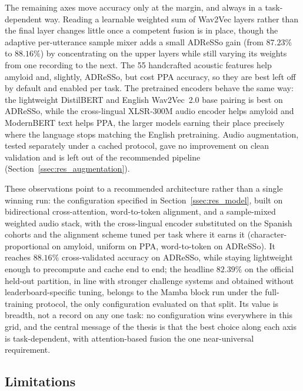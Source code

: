 \documentclass[a4paper,12pt]{article}
\begin{document}
The remaining axes move accuracy only at the margin, and always in a task-dependent way. Reading a learnable weighted sum of Wav2Vec layers rather than the final layer changes little once a competent fusion is in place, though the adaptive per-utterance sample mixer adds a small ADReSSo gain (from $87.23\%$ to $88.16\%$) by concentrating on the upper layers while still varying its weights from one recording to the next. The 55 handcrafted acoustic features help amyloid and, slightly, ADReSSo, but cost PPA accuracy, so they are best left off by default and enabled per task. The pretrained encoders behave the same way: the lightweight DistilBERT and English Wav2Vec~2.0 base pairing is best on ADReSSo, while the cross-lingual XLSR-300M audio encoder helps amyloid and ModernBERT text helps PPA, the larger models earning their place precisely where the language stops matching the English pretraining. Audio augmentation, tested separately under a cached protocol, gave no improvement on clean validation and is left out of the recommended pipeline (Section~\ref{ssec:res_augmentation}).

These observations point to a recommended architecture rather than a single winning run: the configuration specified in Section~\ref{ssec:res_model}, built on bidirectional cross-attention, word-to-token alignment, and a sample-mixed weighted audio stack, with the cross-lingual encoder substituted on the Spanish cohorts and the alignment scheme tuned per task where it earns it (character-proportional on amyloid, uniform on PPA, word-to-token on ADReSSo). It reaches $88.16\%$ cross-validated accuracy on ADReSSo, while staying lightweight enough to precompute and cache end to end; the headline $82.39\%$ on the official held-out partition, in line with stronger challenge systems and obtained without leaderboard-specific tuning, belongs to the Mamba block run under the full-training protocol, the only configuration evaluated on that split. Its value is breadth, not a record on any one task: no configuration wins everywhere in this grid, and the central message of the thesis is that the best choice along each axis is task-dependent, with attention-based fusion the one near-universal requirement.

\subsection{Limitations}
\end{document}
